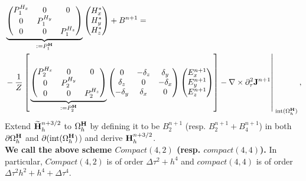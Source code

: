 \documentclass[12pt,reqno]{amsart}
\newcommand{\h}{{\bf H}}
\newcommand{\J}{{\bf J}}
\newtheorem{rem}[theorem]{Remark}
\theoremstyle{definition}
\numberwithin{equation}{section}
\newcommand{\intr}[1]{\mathrm{int}(#1)}
\def\Gwh{\Omega_h}
\begin{document}
	\begin{align*}
		&
	\underbrace{
	\begin{pmatrix}
		P_1^{H_x}  & 0&0 \\
		0 & 	P_1^{H_y}  &\\
		0&0&	P_1^{H_z} 
	\end{pmatrix}
}_{:=P_1^\h}
	\begin{pmatrix}
		H_x^{*}\\
		H_y^{*} \\
		H_z^{*}
	\end{pmatrix}+B^{n+1}
=\\&
-\frac{1}{Z}
\left[ \left.
	\underbrace{
	\begin{pmatrix}
		P_2^{H_x} & 0&0 \\
		0 & P_2^{H_y} &\\
		0&0&P_2^{H_z} 
	\end{pmatrix}
}_{:=P_2^\h}
	\begin{pmatrix}
		0& -\delta_z & \delta _y\\
		\delta_z&0&-\delta_x\\
		-\delta_y&\delta_x&0\\
	\end{pmatrix}
	\begin{pmatrix}
		E_x^{n+1}\\
		E_y^{n+1}\\
		E_z^{n+1}
	\end{pmatrix}\right]	-\nabla\times\partial_{\tau}^2\J^{n+1}\right|_{\; \intr{\Gwh^{\h}}}^{\;},
\end{align*}
		Extend $\widetilde{\h}_h^{n+3/2}$ 
	to $\Gwh^\h$ by defining it to be 
$B_2^{n+1}$ (resp. $B_2^{n+1}+B_4^{n+1}$)
	in both $\partial \Gwh^\h$ and $\partial (\intr{\Gwh^{\h}}$)
	and derive $\h_h^{n+3/2}$. \\[2mm]
{\bf We call the above scheme $Compact(4,2)$ (resp. $compact(4,4)$).}
In particular, $Compact(4,2)$ is of order $\Delta \tau^2+h^4$ and 
$compact(4,4)$ is of order $\Delta\tau^2h^2+h^4+\Delta \tau^4$.
%
%
%
   
\end{document}

